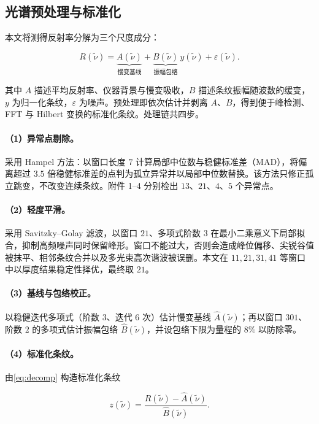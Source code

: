 \documentclass[withoutpreface,bwprint]{cumcmthesis}
\begin{document}
\subsection{光谱预处理与标准化}\label{sec:preprocess}
本文将测得反射率分解为三个尺度成分：

\begin{equation}
	R(\tilde\nu)=\underbrace{A(\tilde\nu)}_{\text{慢变基线}}+\underbrace{B(\tilde\nu)}_{\text{振幅包络}}\,y(\tilde\nu)+\varepsilon(\tilde\nu).
	\label{eq:decomp}
\end{equation}

其中 $A$ 描述平均反射率、仪器背景与慢变吸收，$B$ 描述条纹振幅随波数的缓变，$y$ 为归一化条纹，$\varepsilon$ 为噪声。预处理即依次估计并剥离 $A$、$B$，得到便于峰检测、FFT 与 Hilbert 变换的标准化条纹。处理链共四步。

\paragraph{（1）异常点剔除。}
采用 Hampel 方法：以窗口长度 $7$ 计算局部中位数与稳健标准差（MAD），将偏离超过 $3.5$ 倍稳健标准差的点判为孤立异常并以局部中位数替换。该方法只修正孤立跳变，不改变连续条纹。附件 1--4 分别检出 $13$、$21$、$4$、$5$ 个异常点。

\paragraph{（2）轻度平滑。}
采用 Savitzky--Golay 滤波，以窗口 $21$、多项式阶数 $3$ 在最小二乘意义下局部拟合，抑制高频噪声同时保留峰形。窗口不能过大，否则会造成峰位偏移、尖锐谷值被抹平、相邻条纹合并以及多光束高次谐波被误删。本文在 $11,21,31,41$ 等窗口中以厚度结果稳定性择优，最终取 $21$。

\paragraph{（3）基线与包络校正。}
以稳健迭代多项式（阶数 $3$、迭代 $6$ 次）估计慢变基线 $\widehat A(\tilde\nu)$；再以窗口 $301$、阶数 $2$ 的多项式估计振幅包络 $\widehat B(\tilde\nu)$，并设包络下限为量程的 $8\%$ 以防除零。

\paragraph{（4）标准化条纹。}
由\cref{eq:decomp} 构造标准化条纹

\begin{equation}
	z(\tilde\nu)=\frac{R(\tilde\nu)-\widehat A(\tilde\nu)}{\widehat B(\tilde\nu)}.
	\label{eq:zfringe}
\end{equation}
\end{document}
